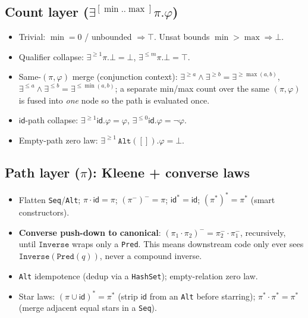 \documentclass[11pt]{article}
\newcommand{\id}{\mathsf{id}}
\newcommand{\Star}{{*}}
\newcommand{\code}[1]{\texttt{#1}}
\theoremstyle{definition}
\begin{document}
\subsection{Count layer ($\exists^{[\min..\max]}\pi.\varphi$)}
\begin{itemize}[leftmargin=1.4em]
  \item Trivial: $\min{=}0$ / unbounded $\Rightarrow\top$. Unsat bounds
  $\min>\max\Rightarrow\bot$.
  \item Qualifier collapse: $\exists^{\geq1}\pi.\bot=\bot$,
  $\exists^{\leq m}\pi.\bot=\top$.
  \item Same-$(\pi,\varphi)$ merge (conjunction context):
  $\exists^{\geq a}\wedge\exists^{\geq b}=\exists^{\geq\max(a,b)}$,
  $\exists^{\leq a}\wedge\exists^{\leq b}=\exists^{\leq\min(a,b)}$; a separate
  min/max count over the same $(\pi,\varphi)$ is fused into \emph{one} node so the
  path is evaluated once.
  \item $\id$-path collapse: $\exists^{\geq1}\id.\varphi=\varphi$,
  $\exists^{\leq0}\id.\varphi=\neg\varphi$.
  \item Empty-path zero law: $\exists^{\geq1}\,\code{Alt}([]).\varphi=\bot$.
\end{itemize}

\subsection{Path layer ($\pi$): Kleene + converse laws}
\begin{itemize}[leftmargin=1.4em]
  \item Flatten \code{Seq}/\code{Alt}; $\pi\cdot\id=\pi$; $(\pi^{-})^{-}=\pi$;
  $\id^{\Star}=\id$; $(\pi^{\Star})^{\Star}=\pi^{\Star}$ (smart constructors).
  \item \textbf{Converse push-down to canonical}:
  $(\pi_1\cdot\pi_2)^{-}=\pi_2^{-}\cdot\pi_1^{-}$, recursively, until $\code{Inverse}$
  wraps only a \code{Pred}. This means downstream code only ever sees
  $\code{Inverse}(\code{Pred}(q))$, never a compound inverse.
  \item \code{Alt} idempotence (dedup via a \code{HashSet}); empty-relation zero
  law.
  \item Star laws: $(\pi\cup\id)^{\Star}=\pi^{\Star}$ (strip $\id$ from an
  \code{Alt} before starring); $\pi^{\Star}\cdot\pi^{\Star}=\pi^{\Star}$ (merge
  adjacent equal stars in a \code{Seq}).
\end{itemize}
\end{document}
